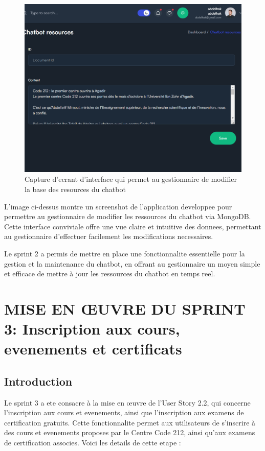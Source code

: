 \documentclass[a4paper, 11pt, openany]{report}
\begin{document}
\begin{figure}[H]
\centering
\includegraphics[width=\textwidth]{assets/images/admin-doc.png} 
\caption{Capture d'ecrant d'interface qui permet au gestionnaire de modifier la base des resources du chatbot}
\label{fig:screen_chat_res}
\end{figure}

L'image ci-dessus montre un screenshot de l'application developpee pour permettre au gestionnaire de modifier les ressources du chatbot via MongoDB. Cette interface conviviale offre une vue claire et intuitive des donnees, permettant au gestionnaire d'effectuer facilement les modifications necessaires.

Le sprint 2 a permis de mettre en place une fonctionnalite essentielle pour la gestion et la maintenance du chatbot, en offrant au gestionnaire un moyen simple et efficace de mettre à jour les ressources du chatbot en temps reel.

\newpage


\chapter{MISE EN ŒUVRE DU SPRINT 3: Inscription aux cours, evenements et certificats}
\section{Introduction}

Le sprint 3 a ete consacre à la mise en œuvre de l'User Story 2.2, qui concerne l'inscription aux cours et evenements, ainsi que l'inscription aux examens de certification gratuits. Cette fonctionnalite permet aux utilisateurs de s'inscrire à des cours et evenements proposes par le Centre Code 212, ainsi qu'aux examens de certification associes. Voici les details de cette etape :
\end{document}
